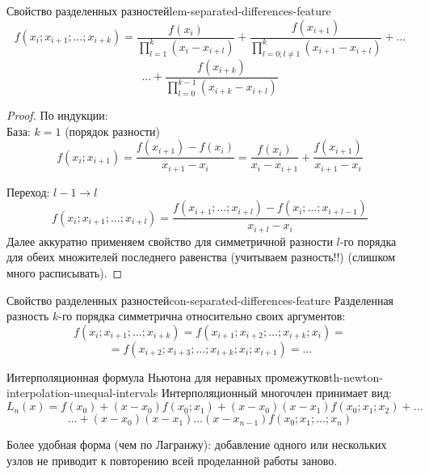 \documentclass[14pt]{extarticle}
\begin{document}
    \clearpage
    \begin{lemma}{Свойство разделенных разностей}{lem-separated-differences-feature}
        $$f(x_{i}; x_{i + 1}; \ldots; x_{i + k}) = \frac{f(x_{i})}{\prod_{l = 1}^{k} (x_{i} - x_{i + l})} + \frac{f(x_{i + 1})}{\prod_{l = 0; l \neq 1}^{k} (x_{i + 1} - x_{i + l})} + \ldots$$ $$\ldots + \frac{f(x_{i + k})}{\prod_{l = 0}^{k - 1} (x_{i + k} - x_{i + l})}$$
    
        \begin{proof}
            По индукции:\\
            База: $k = 1$ (порядок разности)\\
            $$f(x_{i}; x_{i + 1}) = \frac{f(x_{i + 1}) - f(x_{i})}{x_{i + 1} - x_{i}} = \frac{f(x_{i})}{x_{i} - x_{i+1}} + \frac{f(x_{i + 1})}{x_{i + 1} - x_{i}}$$
            
            Переход: $l-1 \to l$\\
            $$f(x_{i}; x_{i + 1}; \ldots; x_{i + l}) = \frac{f(x_{i + 1}; \ldots; x_{i + l}) - f(x_{i}; \ldots; x_{i+l-1})}{x_{i + l} - x_{i}}$$
            Далее аккуратно применяем свойство для симметричной разности $l$-го порядка для обеих множителей последнего равенства (учитываем разность!!) (слишком много расписывать).
        \end{proof}
    \end{lemma}

    \begin{consequence}{Свойство разделенных разностей}{con-separated-differences-feature}
        Разделенная разность $k$-го порядка симметрична относительно своих аргументов:
        $$f(x_{i}; x_{i + 1}; \ldots; x_{i + k}) = f(x_{i + 1}; x_{i + 2}; \ldots; x_{i + k}; x_{i}) = $$ $$ = f(x_{i + 2}; x_{i + 3}; \ldots; x_{i + k}; x_{i}; x_{i + 1}) = \ldots$$ 
    \end{consequence}

    \begin{theorem}{Интерполяционная формула Ньютона для неравных промежутков}{th-newton-interpolation-unequal-intervals}
        Интерполяционный многочлен принимает вид:
        $$L_{n}(x) = f(x_{0}) + (x - x_{0})f(x_{0}; x_{1}) + (x - x_{0})(x - x_{1})f(x_{0};x_{1};x_{2}) + \ldots$$ 
        $$\ldots + (x - x_{0})(x - x_{1})\ldots(x - x_{n-1})f(x_{0}; x_{1}; \ldots; x_{n})$$
    
        Более удобная форма (чем по Лагранжу): добавление одного или нескольких узлов не приводит к повторению всей проделанной работы заново.
    \end{theorem}
\end{document}
